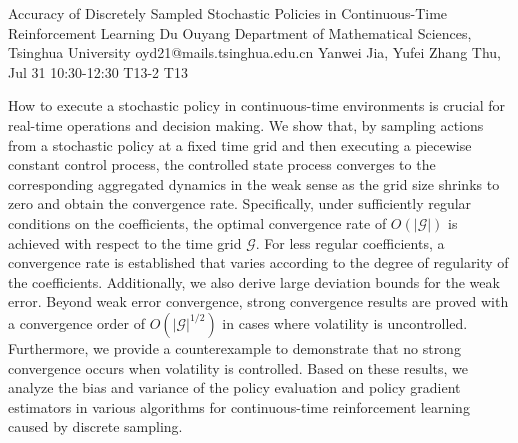 \begin{talk}
  {Accuracy of Discretely Sampled Stochastic Policies in Continuous-Time Reinforcement Learning}%
  {Du Ouyang}%
  {Department of Mathematical Sciences, Tsinghua University}%
  {oyd21@mails.tsinghua.edu.cn}%
  {Yanwei Jia, Yufei Zhang}%
  {}%
  {Thu, Jul 31 10:30-12:30}%
  {T13-2}%
  {T13}%
  
				
			


\medskip

How to execute a stochastic policy in continuous-time environments is crucial for real-time operations and decision making. We show that, by sampling actions from a stochastic policy at a fixed time grid and then executing a piecewise constant control process, the controlled state process converges to the corresponding aggregated dynamics in the weak sense as the grid size shrinks to zero and obtain the convergence rate. Specifically, under sufficiently regular conditions on the coefficients, the optimal convergence rate of $O(|\mathscr{G}|)$ is achieved with respect to the time grid $\mathscr{G}$. For less regular coefficients, a convergence rate is established that varies according to the degree of regularity of the coefficients. Additionally, we also derive large deviation bounds for the weak error. Beyond weak error convergence, strong convergence results are proved with a convergence order of $O(|\mathscr{G}|^{1/2})$ in cases where volatility is uncontrolled. Furthermore, we provide a counterexample to demonstrate that no strong convergence occurs when volatility is controlled. Based on these results, we analyze the bias and variance of the policy evaluation and policy gradient estimators in various algorithms for continuous-time reinforcement learning caused by discrete sampling.


\end{talk}

